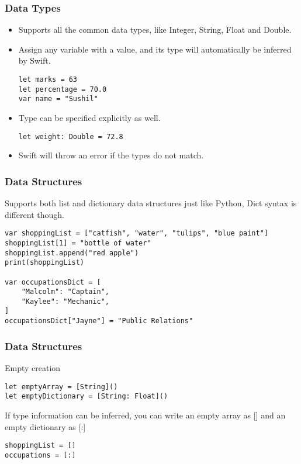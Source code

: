 \begin{frame}[fragile] \frametitle{Data Types}
\begin{itemize}
\item Supports all the common data types, like Integer, String, Float and Double. 
\item Assign any variable with a value, and its type will automatically be inferred by Swift.
\begin{lstlisting}
let marks = 63
let percentage = 70.0
var name = "Sushil"
\end{lstlisting}
\item Type can be specified explicitly as well.
\begin{lstlisting}
let weight: Double = 72.8
\end{lstlisting}
\item Swift will throw an error if the types do not match.
\end{itemize}
\end{frame}

\begin{frame}[fragile] \frametitle{Data Structures}
Supports both list and dictionary data structures just like Python, Dict syntax is different though.
\begin{lstlisting}
var shoppingList = ["catfish", "water", "tulips", "blue paint"]
shoppingList[1] = "bottle of water"
shoppingList.append("red apple")
print(shoppingList)

var occupationsDict = [
    "Malcolm": "Captain",
    "Kaylee": "Mechanic",
]
occupationsDict["Jayne"] = "Public Relations"
\end{lstlisting}


\end{frame}

\begin{frame}[fragile] \frametitle{Data Structures}
Empty creation

\begin{lstlisting}
let emptyArray = [String]()
let emptyDictionary = [String: Float]()
\end{lstlisting}

If type information can be inferred, you can write an empty array as [] and an empty dictionary as [:]
\begin{lstlisting}
shoppingList = []
occupations = [:]
\end{lstlisting}

\end{frame}


